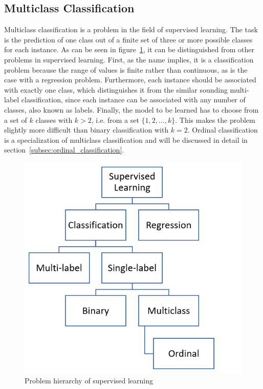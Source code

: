 \documentclass[article,type=msc,colorback,accentcolor=tud7b]{tudthesis}
\begin{document}
  \subsection{Multiclass Classification}
  \label{subsec:multiclass_classification}  
    Multiclass classification is a problem in the field of supervised learning. The task is the prediction of one class out of a finite set of three or more possible classes for each instance. As can be seen in figure~\ref{fig:problem_hierarchy_supervised_learning}, it can be distinguished from other problems in supervised learning. First, as the name implies, it is a classification problem because the range of values is finite rather than continuous, as is the case with a regression problem. Furthermore, each instance should be associated with exactly one class, which distinguishes it from the similar sounding multi-label classification, since each instance can be associated with any number of classes, also known as labels. Finally, the model to be learned has to choose from a set of $k$ classes with $k>2$, i.e. from a set $\{1,2,\dots,k\}$. This makes the problem slightly more difficult than binary classification with $k=2$. Ordinal classification is a specialization of multiclass classification and will be discussed in detail in section~\ref{subsec:ordinal_classification}.
    
    \begin{figure}[H]
      \centering
      \includegraphics{images/problem_hierarchy_supervised_learning}
      \caption{Problem hierarchy of supervised learning}
      \label{fig:problem_hierarchy_supervised_learning}
    \end{figure}
    
\end{document}
